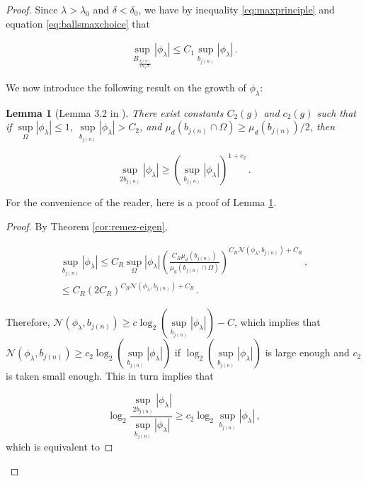 \documentclass{amsart}
\newtheorem{lemma}[theorem]{Lemma}
\begin{document}
\begin{proof}
Since $\lambda > \lambda_0$ and $\delta < \delta_0$,  we have by inequality \eqref{eq:maxprinciple} and equation \eqref{eq:ballsmaxchoice} that 

\begin{align}\label{eq:growthinbigballs}
    \sup\limits_{B_{\frac{\delta j(n)}{4N\sqrt{\lambda}}}} |\phi_{\lambda}| \leq C_1\sup\limits_{b_{j(n)}} |\phi_{\lambda}| \, .
\end{align}

We now introduce the following result on the growth of  $\phi_\lambda$:

\begin{lemma}[Lemma 3.2 in \cite{cha-man}]\label{lemma:growth}
    There exist constants $C_2(g)$ and $c_2(g)$ such that if $\sup\limits_{\Omega} |\phi_{\lambda}| \leq 1$, \linebreak $\sup\limits_{b_{j(n)}} |\phi_{\lambda}| > C_2$, and $\mu_d(b_{j(n)} \cap \Omega) \geq  \mu_d(b_{j(n)})/2$, then

\begin{equation}\label{eq:eqgrowthcharronmangoubi}
   \sup\limits_{2 b_{j(n)}} |\phi_{\lambda}| \geq \left(\sup\limits_{b_{j(n)}} |\phi_{\lambda}| \right)^{1+c_2} \, .
\end{equation}
\end{lemma}

For the convenience of the reader, here is a proof of Lemma \ref{lemma:growth}.

\begin{proof}
By Theorem \ref{cor:remez-eigen},

\begin{align*}
    \sup\limits_{b_{j(n)}}|\phi_\lambda| \leq C_R \sup_\Omega |\phi_\lambda| \left( \frac{C_R \mu_d(b_{j(n)})}{\mu_d(b_{j(n)} \cap \Omega)} \right)^{C_R \mathcal{N}(\phi_\lambda, b_{j(n)})+C_R} \, ,\\
    \leq C_R (2C_R)^{C_R \mathcal{N}(\phi_\lambda, b_{j(n)})+C_R} \, .
\end{align*}

Therefore, $\mathcal{N}(\phi_\lambda,b_{j(n)}) \geq c \log_2(\sup\limits_{b_{j(n)}}|\phi_\lambda| )-C$, which implies that $\mathcal{N}(\phi_\lambda,b_{j(n)}) \geq c_2 \log_2(\sup\limits_{b_{j(n)}}|\phi_\lambda| )$ if $\log_2(\sup\limits_{b_{j(n)}}|\phi_\lambda| ) $ is large enough and $c_2$ is taken small enough. This in turn implies that 

\begin{equation}
    \log_2 \frac{\sup\limits_{2b_{j(n)}}|\phi_\lambda| }{\sup\limits_{b_{j(n)}}|\phi_\lambda| } \geq c_2 \log_2 \sup\limits_{b_{j(n)}}|\phi_\lambda| \, ,
\end{equation}
which is equivalent to


\end{proof}
\end{proof}
\end{document}
